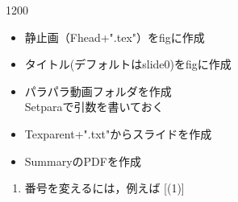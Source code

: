 \documentclass[landscape,10pt]{ujarticle}
\begin{document}
\begin{layer}{120}{0}
\end{layer}

\def\mainslidetitley{22}
\def\ketcletter{black}
\def\ketcbox{slidecolorb}
\def\ketdbox{slidecolorc}
\def\ketcframe{slidecolord}
\def\ketcshadow{slidecolore}
\def\ketdshadow{slidecolorf}
\def\slidetitlex{6}
\def\slidetitlesize{1.3}
\def\mketcletter{black}
\def\mketcbox{yellow}
\def\mketdbox{yellow}
\def\mketcframe{yellow}
\def\mslidetitlex{62}
\def\mslidetitlesize{2}

\color{black}
\Large\bf\boldmath
\thispagestyle{empty}
\addtocounter{page}{-1}







\vspace*{18mm}

\begin{itemize}
\item
{}静止画（Fhead+".tex"）をfigに作成
\item
{}タイトル(デフォルトはslide0)をfigに作成
\item
{}パラパラ動画フォルダを作成\\
\Ltab{25mm}{}Setparaで引数を書いておく
\item
{}Texparent+".txt"からスライドを作成
\item
{}SummaryのPDFを作成
\end{itemize}



\vspace*{18mm}




\sameslide

\vspace*{18mm}

\begin{enumerate}[(1)]
\item
番号を変えるには，例えば [(1)]
\end{enumerate}
\end{document}
